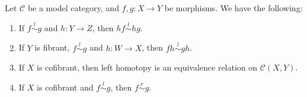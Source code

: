 \documentclass[../thesis.tex]{subfiles}
\begin{document}
            \begin{proposition}\label{prop: basic-homotopy}
                Let $\mathcal{C}$ be a model category, and $f,g: X\rightarrow Y$ be morphisms. We have the following:
                \begin{enumerate}
                    \item If $f \overset{l}{\sim}g$ and $h: Y \rightarrow Z$, then $hf \overset{l}{\sim} hg$.
                    \item If $Y$ is fibrant, $f \overset{l}{\sim} g$ and $h: W \rightarrow X$, then $fh \overset{l}{\sim} gh$.
                    \item If $X$ is cofibrant, then left homotopy is an equivalence relation on $\mathcal{C}(X, Y)$.
                    \item If $X$ is cofibrant and $f \overset{l}{\sim} g$, then $f \overset{r}{\sim} g$.
                \end{enumerate}
            \end{proposition}
\end{document}
